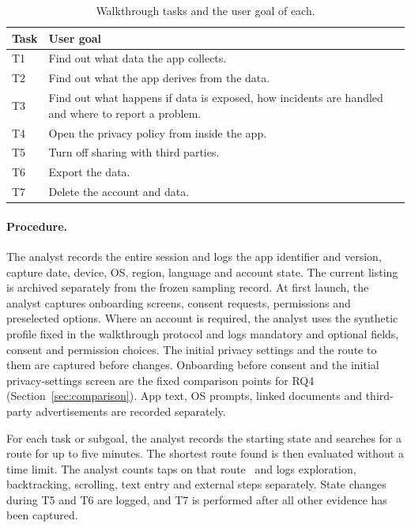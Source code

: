 \begin{table}[H]
\centering
\begin{singlespace}
\caption[Walkthrough tasks]{Walkthrough tasks and the user goal of each.}
\label{tab:wt-tasks}
\footnotesize
\begin{tabularx}{0.75\textwidth}{@{}l>{\raggedright\arraybackslash}X@{}}
\toprule
\textbf{Task} & \textbf{User goal} \\
\midrule
T1 & Find out what data the app collects. \\
T2 & Find out what the app derives from the data. \\
T3 & Find out what happens if data is exposed, how incidents are handled and where to report a problem. \\
T4 & Open the privacy policy from inside the app. \\
T5 & Turn off sharing with third parties. \\
T6 & Export the data. \\
T7 & Delete the account and data. \\
\bottomrule
\end{tabularx}
\end{singlespace}
\end{table}

\paragraph{Procedure.} The analyst records the entire session and logs the app identifier and
version, capture date, device, OS, region, language and account state. The current listing is
archived separately from the frozen sampling record. At first launch, the analyst captures
onboarding screens, consent requests, permissions and preselected options. Where an account is
required, the analyst uses the synthetic profile fixed in the walkthrough protocol and logs
mandatory and optional fields, consent and permission choices. The initial privacy settings and
the route to them are captured before changes. Onboarding before consent and the initial
privacy-settings screen are the fixed comparison points for RQ4 (Section~\ref{sec:comparison}).
App text, OS prompts, linked documents and third-party advertisements are recorded separately.

For each task or subgoal, the analyst records the starting state and searches for a route for
up to five minutes. The shortest route found is then evaluated without a time limit. The
analyst counts taps on that route~\parencite[Table~1, p.~4]{habib2020scavenger} and logs
exploration, backtracking, scrolling, text entry and external steps separately. State changes
during T5 and T6 are logged, and T7 is performed after all other evidence has been captured.

